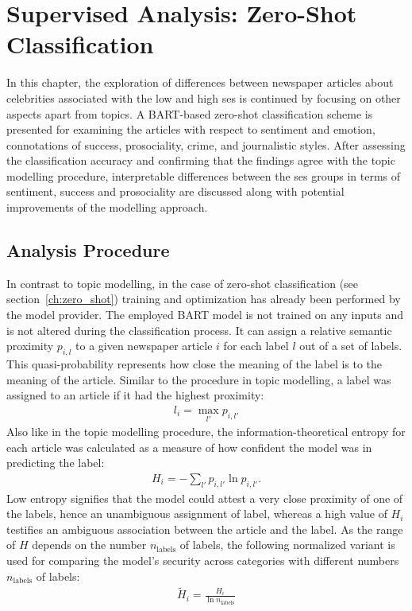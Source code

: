 \renewcommand{\imagepath}{../70-supervised/img}

\chapter{Supervised Analysis: Zero-Shot Classification}\label{ch:supervised}
In this chapter, the exploration of differences between newspaper articles about celebrities associated with the low and high \gls{ses} is continued by focusing on other aspects apart from topics. A BART-based zero-shot classification scheme is presented for examining the articles with respect to sentiment and emotion, connotations of success, prosociality, crime, and journalistic styles. After assessing the classification accuracy and confirming that the findings agree with the topic modelling procedure, interpretable differences between the \gls{ses} groups in terms of sentiment, success and prosociality are discussed along with potential improvements of the modelling approach.

\section{Analysis Procedure}
In contrast to topic modelling, in the case of zero-shot classification (see section~\ref{ch:zero_shot}) training and optimization has already been performed by the model provider. The employed BART model is not trained on any inputs and is not altered during the classification process. It can assign a relative semantic proximity $p_{i, l}$ to a given newspaper article $i$ for each label $l$ out of a set of labels. This quasi-probability represents how close the meaning of the label is to the meaning of the article. Similar to the procedure in topic modelling, a label was assigned to an article if it had the highest proximity:
\begin{align}
    l_{i} = \max_{l'} p_{i, l'}
\end{align}
Also like in the topic modelling procedure, the information-theoretical entropy \autocite{gray_entropy_2013} for each article was calculated as a measure of how confident the model was in predicting the label:
\begin{align}
    H_i = -\sum_{l'} p_{i, l'} \ln p_{i, l'}.
\end{align}
Low entropy signifies that the model could attest a very close proximity of one of the labels, hence an unambiguous assignment of label, whereas a high value of $H_i$ testifies an ambiguous association between the article and the label. As the range of $H$ depends on the number $n_\text{labels}$ of labels, the following normalized variant is used for comparing the model's security across categories with different numbers $n_\text{labels}$ of labels:
\begin{align}
    \widetilde{H}_i = \frac{H_i}{\ln n_\text{labels}}
\end{align}

